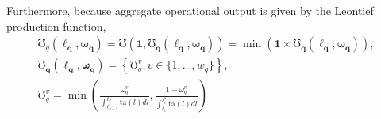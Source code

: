 \documentclass[hidelinks, nonatbib]{elsarticle}
\begin{document}
\begin{enumerate}
    Furthermore, because aggregate operational output is given by the Leontief production function,
    \begin{gather}
        \mho_{q}(
            \boldsymbol{\ell_{q}}
            ,\boldsymbol{\omega_{q}}
        )
        =
        \mho(
            \boldsymbol{1},
            \boldsymbol{\mho_q}(
                \boldsymbol{\ell_{q}}
                ,\boldsymbol{\omega_{q}}
            )
        )
        =
        \min(
            \boldsymbol{1}
            \times
            \boldsymbol{\mho_q}(
                \boldsymbol{\ell_{q}}
                ,\boldsymbol{\omega_{q}}
            )
        )
        ,
        \\
        \boldsymbol{\mho_q}(
            \boldsymbol{\ell_{q}}
            ,\boldsymbol{\omega_{q}}
        )
        =
        \left\{
            \mho_{q}^{v}
            ,
            v \in \{1, \dots, w_q\}
        \right\}
        ,
        \\
        \mho_{q}^{v} = 
        \min
        \left(
                \frac{
                    \omega_{q}^{v}
                }{
                    \int_{\ell_{v-1}^{*}}^{\ell_v}{
                        \text{ta}(l)dl
                    }
                }
                ,
                \frac{
                    1 - \omega_{q}^{v}
                }{
                    \int_{\ell_v}^{\ell_{v}^{*}}{
                        \text{ta}(l)dl
                    }
                }
            \right)

\end{gather}
\end{enumerate}
\end{document}
